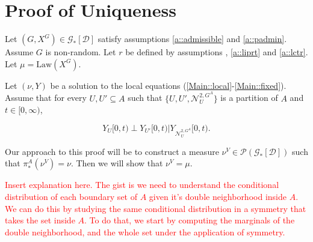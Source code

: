 \documentclass[12pt]{article}
\newcommand{\mc}{\mathcal}
\newcommand{\te}{\text}
\newcommand{\tr}{\textcolor{red}}
\newcommand{\ind}{\hspace{24pt}}
\newcommand{\pmsr}{\mc{P}}							%
\newcommand{\cad}{\mc{D}}							%
\newcommand{\dgneigh}[2]{\mc{N}^{2,#1}_{#2}}		%
\newcommand{\Xf}{X}									%
\newcommand{\rate}{r}								%
\newcommand{\m}{\mu}								%
\newcommand{\proj}{\pi}								%
\newcommand{\vind}[1]{_{#1}}						%
\newcommand{\tmi}[1]{#1}							%
\newcommand{\gind}[1]{^{#1}}						%
\newcommand{\vpara}[1]{^{#1}}						%
\newcommand{\psf}{_*}								%
\newcommand{\Gs}{\mc{G}_\ast}						%
\renewcommand{\sp}[1]{[#1]}							%
\newcommand{\Xg}{Y}									%
\newcommand{\mm}{\nu}								%
\newcommand{\law}{\te{Law}}							%
\begin{document}
\section{Proof of Uniqueness}
\label{Uq}

Let \((G,\Xf\gind{G}) \in \Gs\sp{\cad}\) satisfy assumptions \ref{a::admissible} and \ref{a::padmin}. Assume \(G\) is non-random. Let \(\rate\) be defined by assumptions \cite[\ref{F-a::bddr},\ref{F-a::liprx}]{F}, \ref{a::liprt} and \ref{a::lctr}. Let \(\m = \law(\Xf\gind{G})\).

\ind Let \((\mm,\Xg)\) be a solution to the local equations (\eqref{Main::local}-\eqref{Main::fixed}). Assume that for every \(U,U' \subseteq A\) such that \(\{U,U',\dgneigh{G\vpara{A}}{U}\}\) is a partition of \(A\) and \(t \in [0,\infty)\),

\[\Xg\vind{U}\tmi{[0,t)} \perp \Xg\vind{U'}\tmi{[0,t)} |\Xg\vind{\dgneigh{G\vpara{A}}{U}}\tmi{[0,t)}.\]

Our approach to this proof will be to construct a measure \(\mm\vpara{V} \in \pmsr(\Gs\sp{\cad})\) such that \(\proj\psf\vpara{A}(\mm\vpara{V}) = \mm\). Then we will show that \(\mm\vpara{V} = \m\). 

\ind \tr{Insert explanation here. The gist is we need to understand the conditional distribution of each boundary set of \(A\) given it's double neighborhood inside \(A\). We can do this by studying the same conditional distribution in a symmetry that takes the set inside \(A\). To do that, we start by computing the marginals of the double neighborhood, and the whole set under the application of symmetry.}
\end{document}
